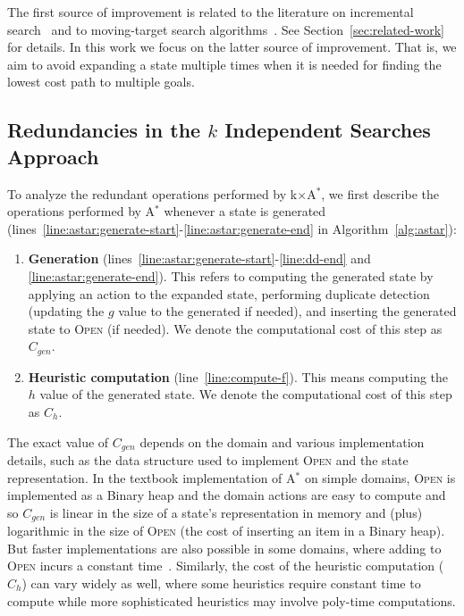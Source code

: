 \documentclass{aicom2e}
\newcommand{\astar}{A$^*$}
\newcommand{\kxastar}{k$\times$A$^*$}
\newcommand{\open}{\textsc{Open}}
\begin{document}
The first source of improvement is related to the literature on incremental
search~\cite{koenig2004lifelong} and to moving-target search
algorithms~\cite{ishida1995moving,koenig2007speeding}. See
Section~\ref{sec:related-work} for details. In this work we focus on the latter
source of improvement. That is, we aim to avoid expanding a state multiple
times when it is needed for finding the lowest cost path to multiple goals.


\subsection{Redundancies in the $k$ Independent Searches Approach}


To analyze the redundant operations performed by \kxastar{}, we first describe
the operations performed by \astar{} whenever a state is generated
(lines~\ref{line:astar:generate-start}-\ref{line:astar:generate-end} in
Algorithm~\ref{alg:astar}):

\begin{enumerate}
    \item {\bf Generation}  (lines~\ref{line:astar:generate-start}-\ref{line:dd-end} and \ref{line:astar:generate-end}).
    This refers to computing the generated state by applying an action to the expanded state,
    performing duplicate detection (updating the $g$ value to the generated if needed),
    and inserting the generated state to \open{} (if needed).
    We denote the computational cost of this step as $C_{gen}$.


    \item {\bf Heuristic computation}  (line~\ref{line:compute-f}). This means computing the $h$ value of the generated state.
    We denote the computational cost of this step as $C_{h}$.
\end{enumerate}
The exact value of $C_{gen}$ depends on the domain and various implementation
details, such as the data structure used to implement \open{} and the state
representation. In the textbook implementation of \astar{} on simple domains,
\open{} is implemented as a Binary heap and the domain actions are easy to
compute and so $C_{gen}$ is linear in the size  of a state's representation in
memory and (plus) logarithmic in the size of \open{} (the cost of inserting an
item in a Binary heap). But faster implementations are also possible in some
domains, where adding to \open{} incurs a constant
time~\cite{GILON2016,BurnsHLR12}. Similarly, the cost of the heuristic
computation ($C_h$) can vary widely as well, where some heuristics require
constant time to compute while more sophisticated heuristics may involve
poly-time computations.
\end{document}
